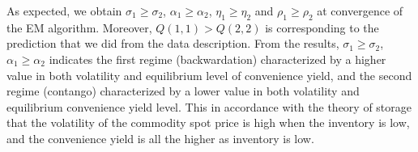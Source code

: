 As expected, we obtain $\sigma_1 \geq \sigma_2$, $\alpha_1 \geq \alpha_2$, $\eta_1 \geq \eta_2$ and $\rho_1 \geq \rho_2$ at convergence of the EM algorithm. Moreover, $Q(1,1) > Q(2,2)$ is corresponding to the prediction that we did from the data description. From the results, $\sigma_1 \geq \sigma_2$, $\alpha_1 \geq \alpha_2$ indicates the first regime (backwardation) characterized by a higher value in both volatility and equilibrium level of convenience yield, and the second regime (contango) characterized by a lower value in both volatility and equilibrium convenience yield level. This in accordance with the theory of storage that the volatility of the commodity spot price is high when the inventory is low, and the convenience yield is all the higher as inventory is low.


